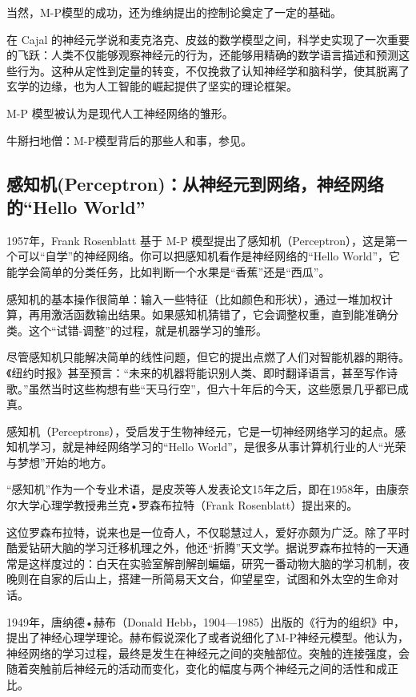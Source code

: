 当然，M-P模型的成功，还为维纳提出的控制论奠定了一定的基础。

在 Cajal 的神经元学说和麦克洛克、皮兹的数学模型之间，科学史实现了一次重要的飞跃：人类不仅能够观察神经元的行为，还能够用精确的数学语言描述和预测这些行为。这种从定性到定量的转变，不仅挽救了认知神经学和脑科学，使其脱离了玄学的边缘，也为人工智能的崛起提供了坚实的理论框架。
 
M-P 模型被认为是现代人工神经网络的雏形。


牛掰扫地僧：M-P模型背后的那些人和事，参见\cite{张玉宏2018}。

\subsection{感知机(Perceptron)：从神经元到网络，神经网络的“Hello World”}

1957年，Frank Rosenblatt 基于 M-P 模型提出了感知机（Perceptron），这是第一个可以“自学”的神经网络。你可以把感知机看作是神经网络的“Hello World”，它能学会简单的分类任务，比如判断一个水果是“香蕉”还是“西瓜”。

感知机的基本操作很简单：输入一些特征（比如颜色和形状），通过一堆加权计算，再用激活函数输出结果。如果感知机猜错了，它会调整权重，直到能准确分类。这个“试错-调整”的过程，就是机器学习的雏形。

尽管感知机只能解决简单的线性问题，但它的提出点燃了人们对智能机器的期待。《纽约时报》甚至预言：“未来的机器将能识别人类、即时翻译语言，甚至写作诗歌。”虽然当时这些构想有些“天马行空”，但六十年后的今天，这些愿景几乎都已成真。

感知机（Perceptrons），受启发于生物神经元，它是一切神经网络学习的起点。感知机学习，就是神经网络学习的“Hello World”，是很多从事计算机行业的人“光荣与梦想”开始的地方。


“感知机”作为一个专业术语，是皮茨等人发表论文15年之后，即在1958年，由康奈尔大学心理学教授弗兰克•罗森布拉特（Frank Rosenblatt）提出来的。

这位罗森布拉特，说来也是一位奇人，不仅聪慧过人，爱好亦颇为广泛。除了平时酷爱钻研大脑的学习迁移机理之外，他还“折腾”天文学。据说罗森布拉特的一天通常是这样度过的：白天在实验室解剖解剖蝙蝠，研究一番动物大脑的学习机制，夜晚则在自家的后山上，搭建一所简易天文台，仰望星空，试图和外太空的生命对话。

1949年，唐纳德•赫布（Donald Hebb，1904—1985）出版的《行为的组织》中，提出了神经心理学理论。赫布假说深化了或者说细化了M-P神经元模型。他认为，神经网络的学习过程，最终是发生在神经元之间的突触部位。突触的连接强度，会随着突触前后神经元的活动而变化，变化的幅度与两个神经元之间的活性和成正比。

